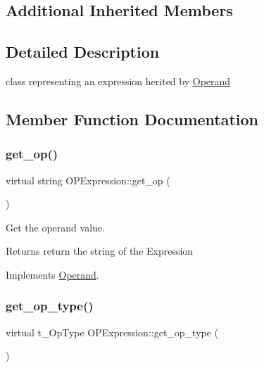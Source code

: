 \subsection*{Additional Inherited Members}


\subsection{Detailed Description}
class representing an expression herited by \mbox{\hyperlink{class_operand}{Operand}} 

\subsection{Member Function Documentation}
\mbox{\label{class_o_p_expression_acf86deca614626b803bc3c29facbefef}} 
\subsubsection{\texorpdfstring{get\+\_\+op()}{get\_op()}}
{\footnotesize\ttfamily virtual string O\+P\+Expression\+::get\+\_\+op (\begin{DoxyParamCaption}{ }\end{DoxyParamCaption})\hspace{0.3cm}{\ttfamily [virtual]}}



Get the operand value. 

\begin{DoxyReturn}{Returns}
return the string of the Expression 
\end{DoxyReturn}


Implements \mbox{\hyperlink{class_operand_a2bf3ad8b34d39cb35ff743ffcc0f4675}{Operand}}.

\mbox{\label{class_o_p_expression_a06f8902130516437d5d93c43a5efcbd2}} 
\subsubsection{\texorpdfstring{get\+\_\+op\+\_\+type()}{get\_op\_type()}}
{\footnotesize\ttfamily virtual t\+\_\+\+Op\+Type O\+P\+Expression\+::get\+\_\+op\+\_\+type (\begin{DoxyParamCaption}{ }\end{DoxyParamCaption})\hspace{0.3cm}{\ttfamily [virtual]}}



